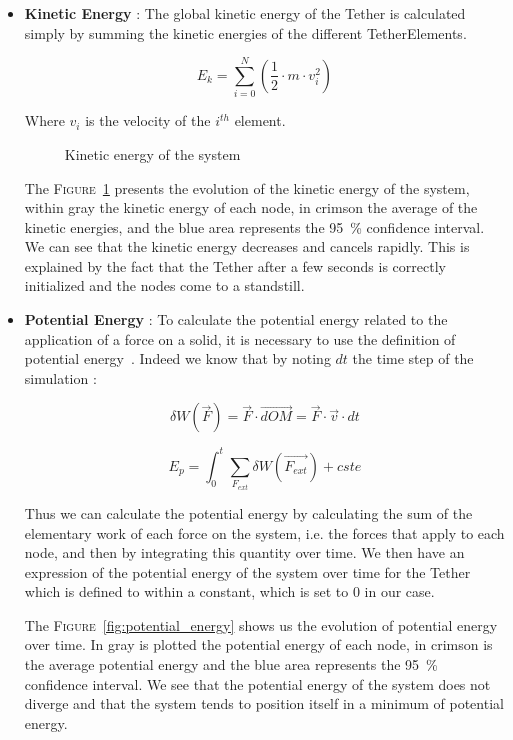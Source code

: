 \begin{itemize}
    \item \textbf{Kinetic Energy} : The global kinetic energy of the Tether is calculated simply by summing the kinetic energies of the different TetherElements.

    $$E_{k} = \sum_{i=0}^N \left(\frac{1}{2} \cdot m \cdot v_i^2 \right)$$
    
    Where $v_i$ is the velocity of the $i^{th}$ element.
    
    \begin{figure}[!htb]
        \centering
        
        \caption{Kinetic energy of the system}
        \label{fig:kinetic_energy}
    \end{figure}

    The \textsc{Figure}~\ref{fig:kinetic_energy} presents the evolution of the kinetic energy of the system, within gray the kinetic energy of each node, in crimson the average of the kinetic energies, and the blue area represents the 95~\% confidence interval. We can see that the kinetic energy decreases and cancels rapidly. This is explained by the fact that the Tether after a few seconds is correctly initialized and the nodes come to a standstill.

    \item \textbf{Potential Energy} : To calculate the potential energy related to the application of a force on a solid, it is necessary to use the definition of potential energy~\cite{viegas2004kinetic}. Indeed we know that by noting $dt$ the time step of the simulation :

    $$\delta W(\overrightarrow{F}) = \overrightarrow{F} \cdot \overrightarrow{dOM} = \overrightarrow{F} \cdot \overrightarrow{v} \cdot dt$$
    
    $$E_p = \int_0^t \sum_{F_{ext}} \delta W(\overrightarrow{F_{ext}}) + cste$$
    
    Thus we can calculate the potential energy by calculating the sum of the elementary work of each force on the system, i.e. the forces that apply to each node, and then by integrating this quantity over time. We then have an expression of the potential energy of the system over time for the Tether which is defined to within a constant, which is set to $0$ in our case.
    
    The \textsc{Figure}~\ref{fig:potential_energy} shows us the evolution of potential energy over time. In gray is plotted the potential energy of each node, in crimson is the average potential energy and the blue area represents the 95~\% confidence interval. We see that the potential energy of the system does not diverge and that the system tends to position itself in a minimum of potential energy.
    

\end{itemize}
